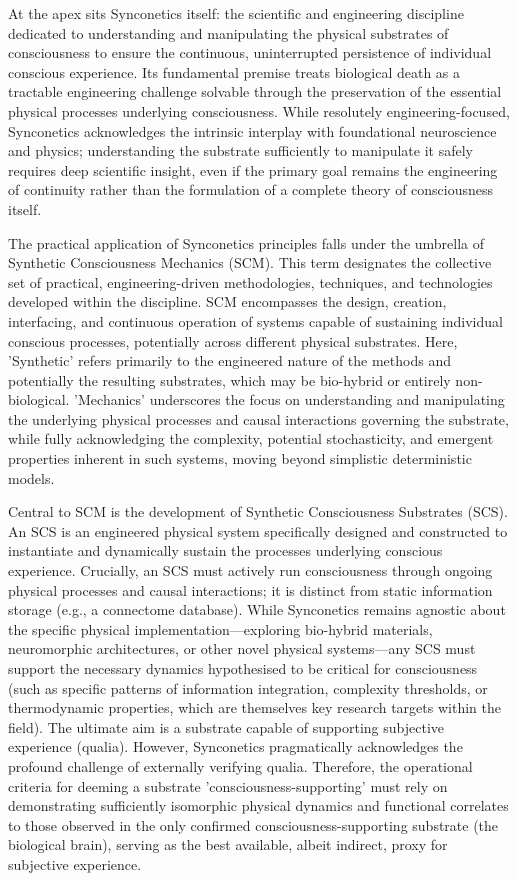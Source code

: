 \documentclass[10pt]{article}
\begin{document}
\begin{sloppypar}
  At the apex sits Synconetics itself: the scientific and engineering discipline dedicated to understanding and manipulating the physical substrates of consciousness to ensure the continuous, uninterrupted persistence of individual conscious experience. Its fundamental premise treats biological death as a tractable engineering challenge solvable through the preservation of the essential physical processes underlying consciousness. While resolutely engineering-focused, Synconetics acknowledges the intrinsic interplay with foundational neuroscience and physics; understanding the substrate sufficiently to manipulate it safely requires deep scientific insight, even if the primary goal remains the engineering of continuity rather than the formulation of a complete theory of consciousness itself.

  The practical application of Synconetics principles falls under the umbrella of Synthetic Consciousness Mechanics (SCM). This term designates the collective set of practical, engineering-driven methodologies, techniques, and technologies developed within the discipline. SCM encompasses the design, creation, interfacing, and continuous operation of systems capable of sustaining individual conscious processes, potentially across different physical substrates. Here, 'Synthetic' refers primarily to the engineered nature of the methods and potentially the resulting substrates, which may be bio-hybrid or entirely non-biological. 'Mechanics' underscores the focus on understanding and manipulating the underlying physical processes and causal interactions governing the substrate, while fully acknowledging the complexity, potential stochasticity, and emergent properties inherent in such systems, moving beyond simplistic deterministic models.

  Central to SCM is the development of Synthetic Consciousness Substrates (SCS). An SCS is an engineered physical system specifically designed and constructed to instantiate and dynamically sustain the processes underlying conscious experience. Crucially, an SCS must actively run consciousness through ongoing physical processes and causal interactions; it is distinct from static information storage (e.g., a connectome database). While Synconetics remains agnostic about the specific physical implementation—exploring bio-hybrid materials, neuromorphic architectures, or other novel physical systems—any SCS must support the necessary dynamics hypothesised to be critical for consciousness (such as specific patterns of information integration, complexity thresholds, or thermodynamic properties, which are themselves key research targets within the field). The ultimate aim is a substrate capable of supporting subjective experience (qualia). However, Synconetics pragmatically acknowledges the profound challenge of externally verifying qualia. Therefore, the operational criteria for deeming a substrate 'consciousness-supporting' must rely on demonstrating sufficiently isomorphic physical dynamics and functional correlates to those observed in the only confirmed consciousness-supporting substrate (the biological brain), serving as the best available, albeit indirect, proxy for subjective experience.


\end{sloppypar}
\end{document}
